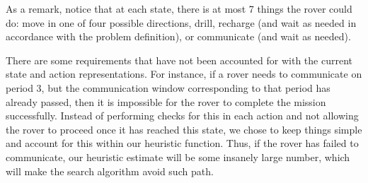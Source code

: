 As a remark, notice that at each state, there is at most 7 things the rover could do: move in one of four
possible directions, drill, recharge (and wait as needed in accordance with the problem definition), or
communicate (and wait as needed).

There are some requirements that have not been accounted for with the current state and action
representations. For instance, if a rover needs to communicate on period 3, but the communication window
corresponding to that period has already passed, then it is impossible for the rover to complete the mission
successfully. Instead of performing checks for this in each action and not allowing the rover to proceed
once it has reached this state, we chose to keep things simple and account for this within our heuristic
function. Thus, if the rover has failed to communicate, our heuristic estimate will be some insanely large
number, which will make the search algorithm avoid such path.